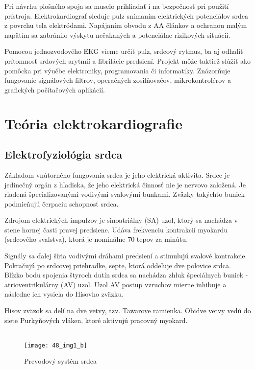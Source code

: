 \documentclass[titlepage]{article}
\begin{document}
Pri návrhu plošného spoja sa muselo prihliadať i na bezpečnosť pri použití prístroja. Elektrokardiograf sleduje pulz snímaním elektrických potenciálov srdca z povrchu tela elektródami. Napájaním obvodu z AA článkov a ochranou malým napätím sa zabránilo výskytu nečakaných a potenciálne rizikových situácií.

Pomocou jednozvodového EKG vieme určiť pulz, srdcový rytmus, ba aj odhaliť prítomnosť srdových arytmií a fibrilácie predsiení. Projekt môže taktiež slúžiť ako pomôcka pri výučbe elektroniky, programovania či informatiky. Znázorňuje fungovanie signálových filtrov, operačných zosilňovačov, mikrokontrolérov a grafických počítačových aplikácií.

\newpage
\section{Teória elektrokardiografie}
\subsection{Elektrofyziológia srdca}

Základom vnútorného fungovania srdca je jeho elektrická aktivita. Srdce je jedinečný orgán z hľadiska, že jeho elektrická činnosť nie je nervovo založená. Je riadená špecializovanými vodivými svalovými bunkami. Zväzky takýchto buniek podmieňujú čerpaciu schopnosť srdca.

Zdrojom elektrických impulzov je sinoatriálny (SA) uzol, ktorý sa nachádza v stene hornej časti pravej predsiene. Udáva frekvenciu kontrakcií myokardu (srdcového svalstva), ktorá je nominálne 70 tepov za minútu.

Signály sa ďalej šíria vodivými dráhami predsiení a stimulujú svalové kontrakcie. Pokračujú po srdcovej priehradke, septe, ktorá oddeľuje dve polovice srdca. Blízko bodu spojenia štyroch dutín srdca sa nachádza zhluk špeciálnych buniek - atrioventrikulárny (AV) uzol. Uzol AV postup vzruchov mierne inhibuje a následne ich vysiela do Hisovho zväzku.

Hisov zväzok  sa delí na dve vetvy, tzv. Tawarove ramienka. Obidve vetvy vedú do siete Purkyňových vláken, ktoré aktivujú pracovný myokard.
\\
\\

\begin{figure}[!ht]
\begin{center}
\texttt{[image: 48\_img1\_b]}
\caption{Prevodový systém srdca}
\end{center}
\end{figure}
\end{document}
